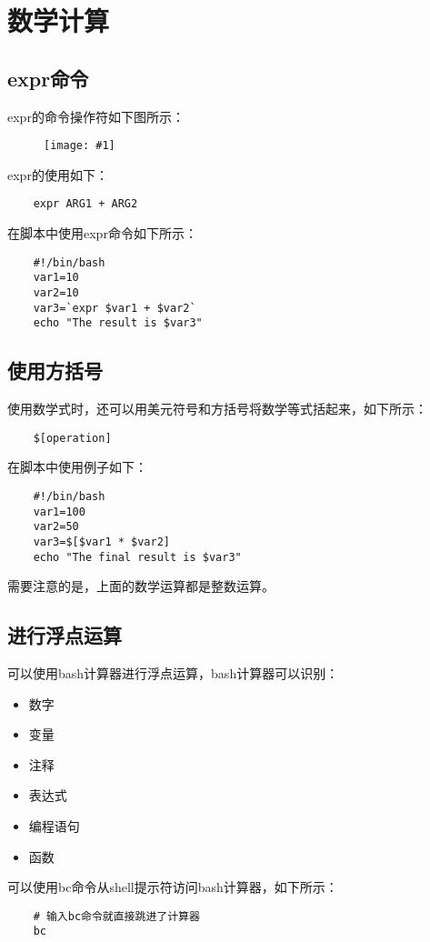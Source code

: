\documentclass[a4paper,left=1.5cm,right=1.5cm,11pt]{article}
\newcommand{\fic}[1]{\begin{figure}[H]
		\center
		\texttt{[image: \#1]}
	\end{figure}}
\begin{document}
\section{数学计算}
\subsection{expr命令}
	expr的命令操作符如下图所示：
	\fic{3.png}

	expr的使用如下：
	\begin{lstlisting}
	expr ARG1 + ARG2
	\end{lstlisting}

	在脚本中使用expr命令如下所示：
	\begin{lstlisting}
	#!/bin/bash
	var1=10
	var2=10
	var3=`expr $var1 + $var2`
	echo "The result is $var3"
	\end{lstlisting}

\subsection{使用方括号}
	使用数学式时，还可以用美元符号和方括号将数学等式括起来，如下所示：
	\begin{lstlisting}
	$[operation]
	\end{lstlisting}

	在脚本中使用例子如下：
	\begin{lstlisting}
	#!/bin/bash
	var1=100
	var2=50
	var3=$[$var1 * $var2]
	echo "The final result is $var3"
	\end{lstlisting}

	需要注意的是，上面的数学运算都是整数运算。

\subsection{进行浮点运算}
	可以使用bash计算器进行浮点运算，bash计算器可以识别：
	\begin{itemize}
		\item 数字
		\item 变量
		\item 注释
		\item 表达式
		\item 编程语句
		\item 函数
	\end{itemize}
	
	可以使用bc命令从shell提示符访问bash计算器，如下所示：
	\begin{lstlisting}
	# 输入bc命令就直接跳进了计算器
	bc
	\end{lstlisting}
\end{document}
